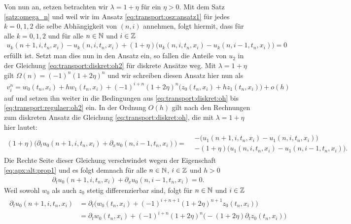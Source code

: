 Von nun an, setzen betrachten wir $\lambda = 1 + \eta$ für ein $\eta > 0$.
Mit dem Satz \ref{satz:omega_n} und weil wir im Ansatz \eqref{eq:transport:osz:ansatz1} für jedes $k = 0,1,2$ die selbe Abhängigkeit von $(n,i)$ annehmen, folgt hiermit, dass für alle $k = 0,1,2$ und für alle $n \in \mathbb N$ und $i \in \mathbb Z$
\begin{align}\label{eq:apx:alt:prop1}
u_k(n+1, i, t_n, x_i) - u_k(n, i, t_n, x_i) + (1 + \eta)\bigl(u_k(n, i, t_n, x_i) - u_k(n, i-1, t_n, x_i) \bigr) = 0
\end{align}
erfüllt ist.
Setzt man dies nun in den Ansatz ein, so fallen die Anteile von $u_2$ in der Gleichung \eqref{eq:transport:diskret:oh2} für diskrete Ansätze weg.
Mit $\lambda = 1 + \eta$ gilt $\Omega(n) = (-1)^n (1 + 2 \eta)^n$ und wir schreiben diesen Ansatz hier nun als
\begin{align}\label{eq:transport:osz:ansatz}
v^n_i = w_0(t_n, x_i) + h  w_1(t_n, x_i) + (-1)^{i+n} (1 + 2 \eta)^n \bigl( z_0(t_n, x_i) + h z_1(t_n, x_i) \bigr) + o(h)
\end{align}
auf und setzen ihn weiter in die Bedingungen aus \eqref{eq:transport:diskret:oh} bis \eqref{eq:transport:regulaer:oh2} ein.
In der Ordnung $O(h)$ gilt nach den Rechnungen zum diskreten Ansatz die Gleichung \eqref{eq:transport:diskret:oh}, die mit $\lambda = 1 + \eta$ hier lautet:
{\small \begin{align*}
(1 + \eta) \bigl( \partial_t u_0(n+1, i, t_n, x_i) + \partial_x u_0(n, i-1, t_n, x_i) \bigr) =
\begin{split}
&- \bigl( u_1(n+1, i, t_n, x_i) - u_1(n, i, t_n, x_i) \bigr)\\
&- (1 + \eta) \bigl(u_1(n, i, t_n, x_i) - u_1(n, i-1, t_n, x_i) \bigr).
\end{split}
\end{align*} }
Die Rechte Seite dieser Gleichung verschwindet wegen der Eigenschaft \eqref{eq:apx:alt:prop1} und es folgt demnach für alle $n \in \mathbb N$, $i \in \mathbb Z$ und $h > 0$
\begin{align*}
\partial_t u_0(n+1, i, t_n, x_i) + \partial_x u_0(n, i-1, t_n, x_i) = 0.
\end{align*}
Weil sowohl $w_0$ als auch $z_0$ stetig differenzierbar sind, folgt für $n \in \mathbb N$ und $i \in \mathbb Z$
\begin{align}
\begin{split}
\partial_t u_0(n+1, i, t_n, x_i) &= \partial_t \bigl( w_0(t_n, x_i) + (-1)^{i+n+1} (1 + 2\eta)^{n+1} z_0(t_n, x_i) \bigr)\\
&= \partial_t w_0(t_n, x_i) + (-1)^{i+n} (1 + 2\eta)^n \bigl( - (1 + 2 \eta) \partial_t z_0(t_n, x_i) \bigr)
\end{split}
\end{align}
